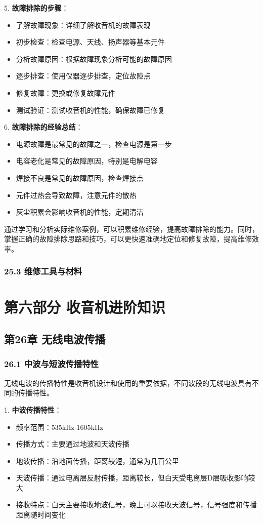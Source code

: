 \documentclass[12pt,UTF8]{ctexbook}
\begin{document}
5. \textbf{故障排除的步骤}：
   \begin{itemize}[leftmargin=3.5em]
   \item 了解故障现象：详细了解收音机的故障表现
   \item 初步检查：检查电源、天线、扬声器等基本元件
   \item 分析故障原因：根据故障现象分析可能的故障原因
   \item 逐步排查：使用仪器逐步排查，定位故障点
   \item 修复故障：更换或修复故障元件
   \item 测试验证：测试收音机的性能，确保故障已修复
   \end{itemize}

6. \textbf{故障排除的经验总结}：
   \begin{itemize}[leftmargin=3.5em]
   \item 电源故障是最常见的故障之一，检查电源是第一步
   \item 电容老化是常见的故障原因，特别是电解电容
   \item 焊接不良是常见的故障原因，检查焊接点
   \item 元件过热会导致故障，注意元件的散热
   \item 灰尘积累会影响收音机的性能，定期清洁
   \end{itemize}

通过学习和分析实际维修案例，可以积累维修经验，提高故障排除的能力。同时，掌握正确的故障排除思路和技巧，可以更快速准确地定位和修复故障，提高维修效率。
\section*{25.3 维修工具与材料}

\part*{第六部分 收音机进阶知识}

\chapter*{第26章 无线电波传播}
\section*{26.1 中波与短波传播特性}

无线电波的传播特性是收音机设计和使用的重要依据，不同波段的无线电波具有不同的传播特性。

1. \textbf{中波传播特性}：
   \begin{itemize}[leftmargin=3.5em]
   \item 频率范围：535kHz-1605kHz
   \item 传播方式：主要通过地波和天波传播
   \item 地波传播：沿地面传播，距离较短，通常为几百公里
   \item 天波传播：通过电离层反射传播，距离较长，但白天受电离层D层吸收影响较大
   \item 接收特点：白天主要接收地波信号，晚上可以接收天波信号，信号强度和传播距离随时间变化
   \end{itemize}
\end{document}
